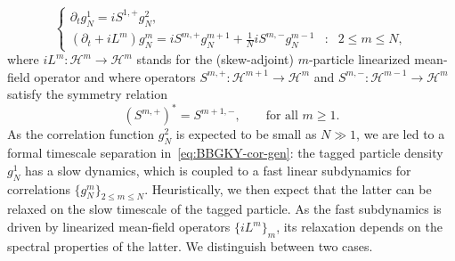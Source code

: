 \documentclass[a4paper,11pt,reqno,noindent]{amsart}
\theoremstyle{plain}
\numberwithin{equation}{section}
\newcommand{\Hc}{\mathcal H}
\newcommand{\3}{|\!|\!|}
\begin{document}
\begin{equation}\label{eq:BBGKY-cor-gen}
\left\{\begin{array}{lll}
\partial_tg_N^1=iS^{1,+}g_N^{2},\\
(\partial_t+iL^m)g_N^m=iS^{m,+}g_N^{m+1}+\tfrac1NiS^{m,-}g_N^{m-1}&:&2\le m\le N,
\end{array}\right.
\end{equation}
where $iL^m:\Hc^m\to\Hc^m$ stands for the (skew-adjoint) $m$-particle linearized mean-field operator and where
operators $S^{m,+}:\Hc^{m+1}\to \Hc^{ m}$ and $S^{m,-}:\Hc^{m-1}\to \Hc^{ m}$ satisfy the symmetry relation
\begin{equation}\label{eq:S-sym-intro}
(S^{m,+})^*=S^{m+1,-},\qquad\text{for all $m\ge1$.}
\end{equation}
As the correlation function $g_N^2$ is expected to be small as $N\gg1$, we are led to a formal timescale separation in~\eqref{eq:BBGKY-cor-gen}: the tagged particle density $g_N^1$ has a slow dynamics, which is coupled to a fast linear subdynamics for correlations $\{g_N^m\}_{2\le m\le N}$.
Heuristically, we then expect that the latter can be relaxed on the slow timescale of the tagged particle. As the fast subdynamics is driven by linearized mean-field operators $\{iL^m\}_m$, its relaxation depends on the spectral properties of the latter. We distinguish between two cases.
\end{document}
